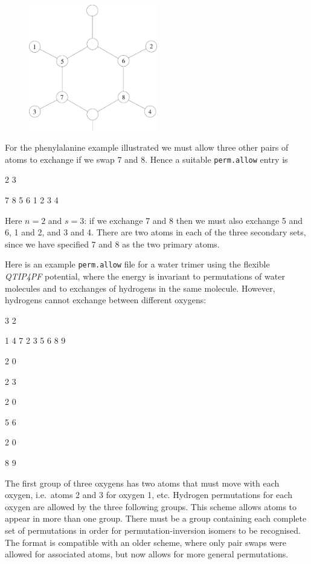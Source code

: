 \documentclass[12pt,a4paper,dvips]{article}
\begin{document}
\begin{itemize}
\begin{figure}[hH]
\centerline{\includegraphics[width=0.5\textwidth]{PHE.eps}}
\end{figure}

For the phenylalanine example illustrated we must allow three other pairs of
atoms to exchange if we swap 7 and 8. Hence a suitable {\tt perm.allow} entry is
{

2 3

7 8 5 6 1 2 3 4
}
Here $n=2$ and $s=3$: if we exchange 7 and 8 then we must also exchange 5 and 6,
1 and 2, and 3 and 4. There are two atoms in each of the three secondary sets, 
since we have specified 7 and 8 as the two primary atoms.

Here is an example {\tt perm.allow} file for a water trimer using
the flexible {\it QTIP4PF\/} potential, where the energy is invariant to permutations
of water molecules and to exchanges of hydrogens in the same molecule. However,
hydrogens cannot exchange between different oxygens:
{

3 2

1 4 7 2 3 5 6 8 9

2 0 

2 3

2 0 

5 6

2 0 

8 9
}
The first group of three oxygens has two atoms that must move with each oxygen,
i.e.~atoms 2 and 3 for oxygen 1, etc. Hydrogen permutations for each oxygen are
allowed by the three following groups. This scheme allows atoms to appear in more 
than one group. There must be a group containing each complete set of permutations
in order for permutation-inversion isomers to be recognised. The format
is compatible with an older scheme, where only pair swaps were allowed for
associated atoms, but now allows for more general permutations.


\end{itemize}
\end{document}
